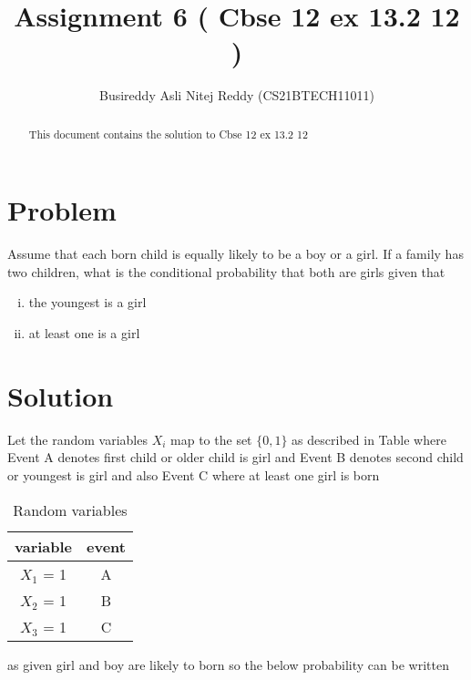 \documentclass[journal,12pt,twocolumn]{IEEEtran}
\title{Assignment 6 ( Cbse 12 ex 13.2 12 )}
\author{Busireddy Asli Nitej Reddy (CS21BTECH11011)}
\date{}
\begin{document}
\maketitle



\begin{abstract}
This document contains the solution to Cbse 12 ex 13.2 12
\end{abstract}

\section*{\textbf{Problem}}
 Assume that each born child is equally likely to be a boy or a girl. If a family has two children, what is the conditional probability that both are girls given that

     \begin{enumerate}[i)]
         \item  the youngest is a girl
         \item  at least one is a girl
     \end{enumerate}
     

\section*{\textbf{Solution}}
    
    
    Let the random variables $X_{i}$ map to the set $\{ 0,1 \}$ as described in Table
    where Event A denotes first child or older child is girl and Event B denotes second child or youngest is girl and also Event C where at least one girl is born 


    \begin{table}[!htb]
        \centering
         {
            \begin{tabular}{|c|c|}
              \hline
               variable & event \\ \hline
               $X_{1}$ = 1  & A  \\ \hline
               $X_{2}$ = 1  & B  \\ \hline
               $X_{3}$ = 1  & C  \\ \hline
            \end{tabular}
            }
        \caption{ Random variables }
        \label{tab:table}
    \end{table}
    
    as given girl and boy are likely to born so the below probability can be written 
    
\end{document}
